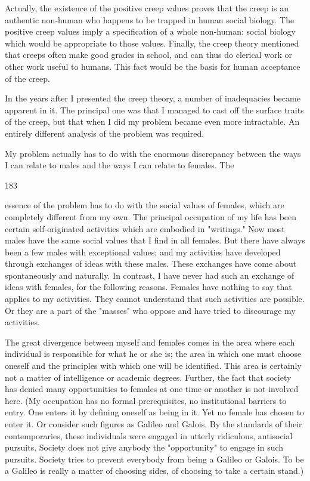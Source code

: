 \documentclass[10pt,twoside]{memoir}
\begin{document}
\begin{enumerate}
{{Actually, the existence of the positive creep values proves that the 
creep is an authentic non-human who happens to be trapped in human social 
biology. The positive creep values imply a specification of a whole 
non-human: social biology which would be appropriate to those values. 
Finally, the creep theory mentioned that creeps often make good grades in 
school, and can thus do clerical work or other work useful to humans. This 
fact would be the basis for human acceptance of the creep. 

In the years after I presented the creep theory, a number of 
inadequacies became apparent in it. The principal one was that I managed to 
cast off the surface traits of the creep, but that when I did my problem 
became even more intractable. An entirely different analysis of the problem 
was required. 

My problem actually has to do with the enormous discrepancy between 
the ways I can relate to males and the ways I can relate to females. The 


183 


essence of the problem has to do with the social values of females, which are 
completely different from my own. The principal occupation of my life has 
been certain self-originated activities which are embodied in "writings." Now 
most males have the same social values that I find in all females. But there 
have always been a few males with exceptional values; and my activities have 
developed through exchanges of ideas with these males. These exchanges 
have come about spontaneously and naturally. In contrast, I have never had 
such an exchange of ideas with females, for the following reasons. Females 
have nothing to say that applies to my activities. They cannot understand 
that such activities are possible. Or they are a part of the "masses" who 
oppose and have tried to discourage my activities. 

The great divergence between myself and females comes in the area 
where each individual is responsible for what he or she is; the area in which 
one must choose oneself and the principles with which one will be identified. 
This area is certainly not a matter of intelligence or academic degrees. 
Further, the fact that society has denied many opportunities to females at 
one time or another is not involved here. (My occupation has no formal 
prerequisites, no institutional barriers to entry. One enters it by defining 
oneself as being in it. Yet no female has chosen to enter it. Or consider such 
figures as Galileo and Galois. By the standards of their contemporaries, these 
individuals were engaged in utterly ridiculous, antisocial pursuits. Society 
does not give anybody the "opportunity" to engage in such pursuits. Society 
tries to prevent everybody from being a Galileo or Galois. To be a Galileo is 
really a matter of choosing sides, of choosing to take a certain stand.) 

}}
\end{enumerate}
\end{document}
